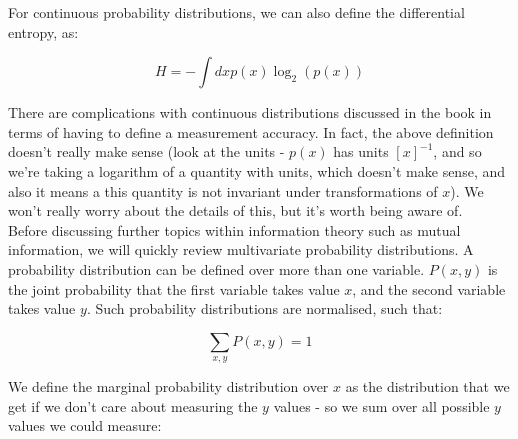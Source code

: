 \documentclass{article}
\begin{document}
\begin{figure}[H]
\begin{subfigure}[t][][t]{0.45\textwidth}
		\centering
	\end{subfigure}
\end{figure}

For continuous probability distributions, we can also define the differential entropy, as:

\begin{equation*}
	H = -\int dx p(x) \log_2(p(x))
\end{equation*}

There are complications with continuous distributions discussed in the book in terms of having to define a measurement accuracy. In fact, the above definition doesn't really make sense (look at the units - $p(x)$ has units $[x]^{-1}$, and so we're taking a logarithm of a quantity with units, which doesn't make sense, and also it means a this quantity is not invariant under transformations of $x$). We won't really worry about the details of this, but it's worth being aware of.\\

Before discussing further topics within information theory such as mutual information, we will quickly review multivariate probability distributions. A probability distribution can be defined over more than one variable. $P(x,y)$ is the joint probability that the first variable takes value $x$, and the second variable takes value $y$. Such probability distributions are normalised, such that:

\begin{equation*}
	\sum_{x,y} P(x,y) = 1
\end{equation*}

We define the marginal probability distribution over $x$ as the distribution that we get if we don't care about measuring the $y$ values - so we sum over all possible $y$ values we could measure:
\end{document}
